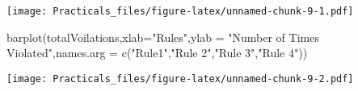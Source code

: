 \documentclass[
]{article}
\newenvironment{Shaded}{\begin{snugshade}}{\end{snugshade}}
\newcommand{\AttributeTok}[1]{\textcolor[rgb]{0.77,0.63,0.00}{#1}}
\newcommand{\FunctionTok}[1]{\textcolor[rgb]{0.00,0.00,0.00}{#1}}
\newcommand{\NormalTok}[1]{#1}
\newcommand{\StringTok}[1]{\textcolor[rgb]{0.31,0.60,0.02}{#1}}
\begin{document}
\texttt{[image: Practicals\_files/figure-latex/unnamed-chunk-9-1.pdf]}

\begin{Shaded}
\begin{Highlighting}[]
\FunctionTok{barplot}\NormalTok{(totalVoilations,}\AttributeTok{xlab=}\StringTok{"Rules"}\NormalTok{,}\AttributeTok{ylab =} \StringTok{"Number of Times Violated"}\NormalTok{,}\AttributeTok{names.arg =} \FunctionTok{c}\NormalTok{(}\StringTok{"Rule1"}\NormalTok{,}\StringTok{"Rule 2"}\NormalTok{,}\StringTok{"Rule 3"}\NormalTok{,}\StringTok{"Rule 4"}\NormalTok{))}
\end{Highlighting}
\end{Shaded}

\texttt{[image: Practicals\_files/figure-latex/unnamed-chunk-9-2.pdf]}
\end{document}
